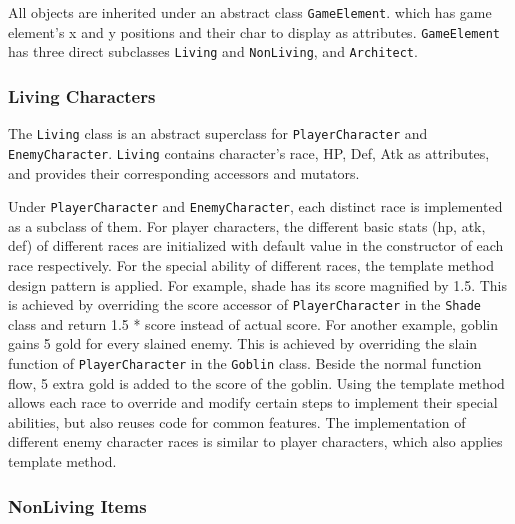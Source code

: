 \documentclass[11pt]{article}
\theoremstyle{plain} \newtheorem{theorem*}{Theorem}[subsection]
\begin{document}
All objects are inherited under an abstract class \texttt{GameElement}. which
has game element's x and y positions and their char to display as attributes.
\texttt{GameElement} has three direct subclasses \texttt{Living} and
\texttt{NonLiving}, and \texttt{Architect}.


\subsubsection{Living Characters}

The \texttt{Living} class is an abstract superclass for
\texttt{PlayerCharacter} and \texttt{EnemyCharacter}.  \texttt{Living} contains
character's race, HP, Def, Atk as attributes, and provides their corresponding
accessors and mutators.

Under \texttt{PlayerCharacter} and \texttt{EnemyCharacter}, each distinct race
is implemented as a subclass of them.  For player characters, the different
basic stats (hp, atk, def) of different races are initialized with default
value in the constructor of each race respectively.  For the special ability of
different races, the template method design pattern is applied. For example,
shade has its score magnified by 1.5. This is achieved by overriding the score
accessor of \texttt{PlayerCharacter} in the \texttt{Shade} class and return 1.5
* score instead of actual score. For another example, goblin gains 5 gold for
every slained enemy. This is achieved by overriding the \textsf{slain} function
of \texttt{PlayerCharacter} in the \texttt{Goblin} class.  Beside the normal
function flow, 5 extra gold is added to the score of the goblin.  Using the
template method allows each race to override and modify certain steps to
implement their special abilities, but also reuses code for common features.
The implementation of different enemy character races is similar to player
characters, which also applies template method.

\subsubsection{NonLiving Items}
\end{document}
